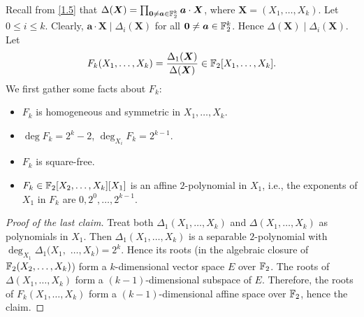 \documentclass{amsart}
\numberwithin{equation}{section}
\theoremstyle{definition}
\newcommand{\f}{\Bbb F}
\newcommand{\ba}{\boldsymbol a}
\newcommand{\x}{\boldsymbol X}
\begin{document}
Recall from \eqref{1.5} that $\Delta(\x)=\prod_{\boldsymbol 0\ne\ba\in\f_2^k}\ba\cdot \x$, where $\x=(X_1,\dots,X_k)$. Let $0\le i\le k$. Clearly, $\ba\cdot \x\mid \Delta_i(\x)$ for all $\boldsymbol 0\ne\ba\in\f_2^k$. Hence $\Delta(\x)\mid\Delta_i(\x)$. Let 
\begin{equation}\label{3.0}
F_k(X_1,\dots,X_k)=\frac{\Delta_1(\x)}{\Delta(\x)}\in\f_2[X_1,\dots,X_k].
\end{equation}
We first gather some facts about $F_k$:
\begin{itemize}
\item $F_k$ is homogeneous and symmetric in $X_1,\dots,X_k$.

\item $\deg F_k=2^k-2$, $\deg_{X_i}F_k=2^{k-1}$.

\item $F_k$ is square-free.

\item $F_k\in \f_2[X_2,\dots,X_k][X_1]$ is an affine $2$-polynomial in $X_1$, i.e., the exponents of $X_1$ in $F_k$ are $0, 2^0,\dots,2^{k-1}$.
\end{itemize}

\begin{proof}[Proof of the last claim]
Treat both $\Delta_1(X_1,\dots,X_k)$ and $\Delta(X_1,\dots,X_k)$ as polynomials in $X_1$. Then $\Delta_1(X_1,\dots,X_k)$ is a separable $2$-polynomial with $\deg_{X_1}\Delta_1(X_1,$ $\dots,X_k)=2^k$. Hence its roots (in the algebraic closure of $\f_2(X_2,\dots,X_k)$) form a $k$-dimensional vector space $E$ over $\f_2$. The roots of $\Delta(X_1,\dots,X_k)$ form a $(k-1)$-dimensional subspace of $E$. Therefore, the roots of $F_k(X_1,\dots,X_k)$ form a $(k-1)$-dimensional affine space over $\f_2$, hence the claim.
\end{proof}
\end{document}
